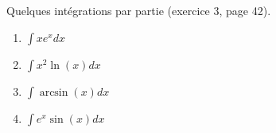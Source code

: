 \begin{exercice}\label{exoGeneral0019}

Quelques intégrations par partie (exercice 3, page 42).
\begin{enumerate}

\item
$\int xe^x dx$
\item
$\int x^2\ln(x) dx$
\item
$\int \arcsin(x) dx$
\item
$\int e^x\sin(x) dx$

\end{enumerate}

\end{exercice}
